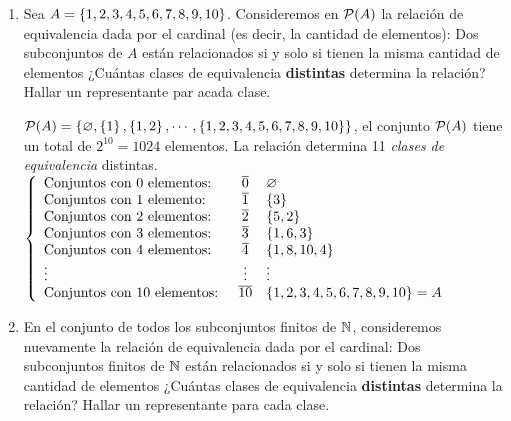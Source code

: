 \ejercicio
\begin{enumerate}[label=\roman*)]
	\item
	      Sea $A = \set{1, 2, 3, 4, 5, 6, 7, 8, 9, 10}$. Consideremos en $\partes(A)$ la relación de equivalencia dada
	      por el cardinal (es decir, la cantidad de elementos): Dos subconjuntos de $A$ están relacionados si y solo si tienen la misma cantidad
	      de elementos ¿Cuántas clases de equivalencia \textbf{distintas} determina la relación? Hallar un representante par acada clase.\\

	      \separadorCorto

	      $\partes(A) = \set{\vacio, \set{1}, \set{1,2}, \cdots, \set{1, 2, 3, 4, 5, 6, 7, 8, 9, 10}}$, el conjunto $\partes(A)$ tiene un total de
	      $2^{10} = 1024$ elementos. La relación determina 11 \textit{clases de equivalencia} distintas.\\
	      $\llave{lcl}{
			      \text{Conjuntos con 0 elementos: } & \clase{0}  & \vacio\\
			      \text{Conjuntos con 1 elemento: } & \clase{1} & \set{3}\\
			      \text{Conjuntos con 2 elementos: }& \clase{2} & \set{5,2}\\
			      \text{Conjuntos con 3 elementos: }& \clase{3} & \set{1,6, 3}\\
			      \text{Conjuntos con 4 elementos: }& \clase{4} & \set{1,8, 10,4}\\
			      \vdots                            &\vdots  & \vdots\\
			      \text{Conjuntos con 10 elementos: } & \clase{10} & \set{1,2,3,4,5,6,7,8,9,10} = A\\
		      }$

	\item
	      En el conjunto de todos los subconjuntos finitos de $\naturales$, consideremos nuevamente la relación de equivalencia dada por el cardinal: Dos subconjuntos finitos
	      de $\naturales$ están relacionados si y solo si tienen la misma cantidad de elementos ¿Cuántas clases de equivalencia \textbf{distintas} determina la relación?
	      Hallar un representante para cada clase.\\

	      \separadorCorto


\end{enumerate}
